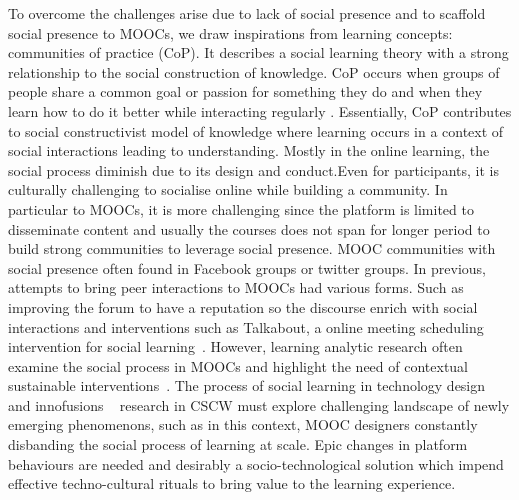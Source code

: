 \documentclass[manuscript,screen,review]{acmart}
\begin{document}
To overcome the challenges arise due to lack of social presence and to scaffold social presence to MOOCs, we draw inspirations from learning concepts: communities of practice (CoP). It describes a social learning theory with a strong relationship to the social construction of knowledge. CoP occurs when groups of people share a common goal or passion for something they do and when they learn how to do it better while interacting regularly \cite{wenger1999communities}. Essentially, CoP contributes to social constructivist model of knowledge where learning occurs in a context of social interactions leading to understanding. Mostly in the online learning, the social process diminish due to its design and conduct.Even for participants, it is culturally challenging to socialise online while building a community. In particular to MOOCs, it is more challenging since the platform is limited to disseminate content and usually the courses does not span for longer period to build strong communities to leverage social presence. MOOC communities with social presence often found in Facebook groups or twitter groups. In previous,  attempts to bring peer interactions to MOOCs had various forms. Such as improving the forum to have a reputation so the discourse enrich with social interactions and interventions such as Talkabout, a online meeting scheduling intervention for social learning~\cite{kulkarni2015talkabout}. However, learning analytic research often examine the social process in MOOCs and highlight the need of contextual sustainable interventions~\cite{poquet2018mooc}. The process of social learning in technology design and innofusions ~\cite{williams2005social} research in CSCW  must explore  challenging landscape of newly emerging phenomenons, such as in this context, MOOC designers constantly disbanding the social process of learning at scale. Epic changes in platform behaviours are needed and desirably a socio-technological solution which impend effective techno-cultural rituals to bring value to the learning experience. 
\end{document}
